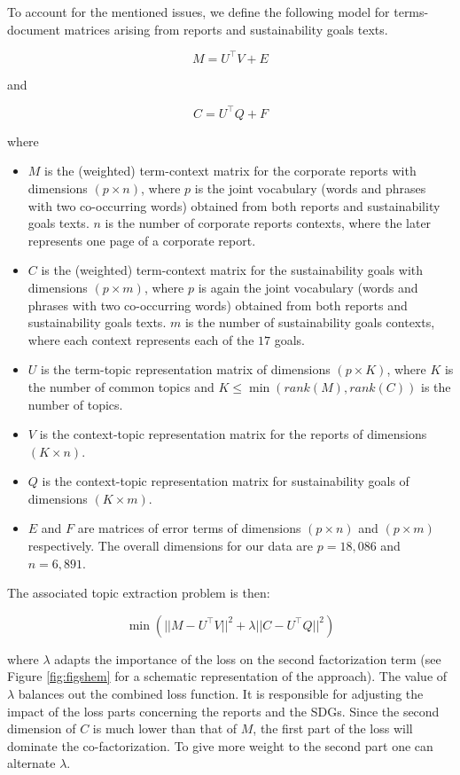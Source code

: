\documentclass[
]{article}
\providecommand{\tightlist}{%
  \setlength{\itemsep}{0pt}\setlength{\parskip}{0pt}}
\begin{document}
To account for the mentioned issues, we define the following model for terms-document matrices arising from reports and sustainability goals texts.

\[M = U^\top V + E\]

and

\[C = U^\top Q + F\]

where

\begin{itemize}
\tightlist
\item
  \(M\) is the (weighted) term-context matrix for the corporate reports with dimensions \((p\times n)\), where \(p\) is the joint vocabulary (words and phrases with two co-occurring words) obtained from both reports and sustainability goals texts. \(n\) is the number of corporate reports contexts, where the later represents one page of a corporate report.
\item
  \(C\) is the (weighted) term-context matrix for the sustainability goals with dimensions \((p\times m)\), where \(p\) is again the joint vocabulary (words and phrases with two co-occurring words) obtained from both reports and sustainability goals texts. \(m\) is the number of sustainability goals contexts, where each context represents each of the \(17\) goals.
\item
  \(U\) is the term-topic representation matrix of dimensions \((p\times K)\), where \(K\) is the number of common topics and \(K\leq \min(rank(M),rank(C))\) is the number of topics.
\item
  \(V\) is the context-topic representation matrix for the reports of dimensions \((K\times n)\).
\item
  \(Q\) is the context-topic representation matrix for sustainability goals of dimensions \((K\times m)\).
\item
  \(E\) and \(F\) are matrices of error terms of dimensions \((p\times n)\) and \((p\times m)\) respectively.
  The overall dimensions for our data are \(p=18,086\) and \(n=6,891\).
\end{itemize}

The associated topic extraction problem is then:

\begin{equation}\min(||M - U^\top V||^2 + \lambda ||C-U^\top Q||^2)\label{eq:minc}
\end{equation}

where \(\lambda\) adapts the importance of the loss on the second factorization term (see Figure \ref{fig:figshem} for a schematic representation of the approach).
The value of \(\lambda\) balances out the combined loss function. It is responsible for adjusting the impact of the loss parts concerning the reports and the SDGs. Since the second dimension of \(C\) is much lower than that of \(M\), the first part of the loss will dominate the co-factorization. To give more weight to the second part one can alternate \(\lambda\).
\end{document}
